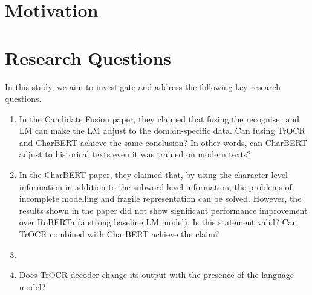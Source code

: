 \label{chap:1_intro}
\section{Motivation}
\section{Research Questions}
In this study, we aim to investigate and address the following key research questions. 
\begin{enumerate}
    \item In the Candidate Fusion paper, they claimed that fusing the recogniser and LM can make the LM adjust to the domain-specific data. Can fusing TrOCR and CharBERT achieve the same conclusion? In other words, can CharBERT adjust to historical texts even it was trained on modern texts?
    \item In the CharBERT paper, they claimed that, by using the character level information in addition to the subword level information, the problems of incomplete modelling and fragile 
    representation can be solved. However, the results shown in the paper did not show significant performance improvement over RoBERTa (a strong baseline LM model). Is this statement valid? Can TrOCR combined with CharBERT achieve the claim?
    \item 
    \item Does TrOCR decoder change its output with the presence of the language model?
\end{enumerate}

